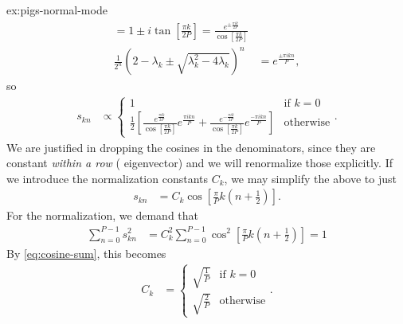 \begin{DefAnswer}{ex:pigs-normal-mode}
\begin{subequations}
\begin{align}
		= 1 \pm i \tan{\left[ \frac{\pi k}{2 P} \right]}
		= \frac{e^{\pm \frac{\pi i k}{2 P}}}{\cos{\left[ \frac{\pi k}{2 P} \right]}} \\
		\frac{1}{2^n} \left( 2 - \lambda_k \pm \sqrt{\lambda_k^2 - 4 \lambda_k} \right)^n
		&= e^{\frac{\pm \pi i k n}{P}},
	\end{align}
	\end{subequations}
	so
	\begin{align}
		s_{kn}
		&\propto \begin{cases}
				1 & \text{if } k = 0 \\
				\frac{1}{2} \left[
					\frac{e^{\frac{\pi i k}{2 P}}}{\cos{\left[ \frac{\pi k}{2 P} \right]}} e^{\frac{\pi i k n}{P}}
						+ \frac{e^{-\frac{\pi i k}{2 P}}}{\cos{\left[ \frac{\pi k}{2 P} \right]}} e^{\frac{-\pi i k n}{P}}
				\right] & \text{otherwise}
			\end{cases}.
	\end{align}
	We are justified in dropping the cosines in the denominators, since they are constant \emph{within a row} (\ie{} eigenvector) and we will renormalize those explicitly.
	If we introduce the normalization constants $C_k$, we may simplify the above to just
	\begin{align}
		s_{kn}
		&= C_k \cos{\left[ \frac{\pi}{P} k \left( n + \frac{1}{2} \right) \right]}.
			\label{eq:pigs-nm-transform}
	\end{align}
	For the normalization, we demand that
	\begin{align}
		\sum_{n=0}^{P-1} s_{kn}^2
		&= C_k^2 \sum_{n=0}^{P-1} \cos^2{\left[ \frac{\pi}{P} k \left( n + \frac{1}{2} \right) \right]}
		= 1
	\end{align}
	By \vref{eq:cosine-sum}, this becomes
	\begin{align}
		C_k
		&= \begin{cases}
				\sqrt{\frac{1}{P}} & \text{if } k = 0 \\
				\sqrt{\frac{2}{P}} & \text{otherwise}
			\end{cases}.
	\end{align}


\end{DefAnswer}
